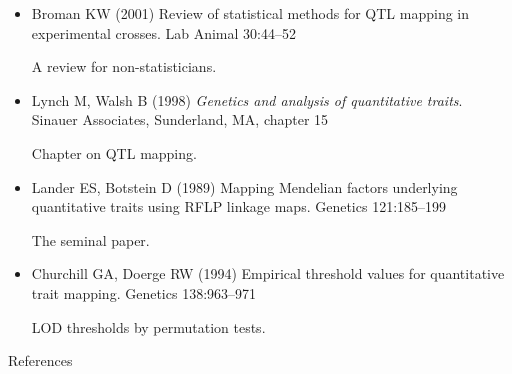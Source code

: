 \documentclass[12pt]{article}
\newcommand{\headsize}{\fontsize{35}{35} \selectfont}
\newcommand{\smallestsize}{\fontsize{18}{22} \selectfont}
\begin{document}
\color{mywhite} \smallestsize

\hspace*{0.5in}
\begin{minipage}{9.5in}
\begin{itemize}
\itemsep12pt
\item Broman KW (2001) Review of statistical methods for QTL mapping in
experimental crosses. Lab Animal 30:44--52

{\color{myblue} A review for non-statisticians.}

\item Lynch M, Walsh B (1998) \emph{Genetics and analysis of quantitative
traits}. Sinauer Associates, Sunderland, MA, chapter 15

{\color{myblue} Chapter on QTL mapping.}

\item Lander ES, Botstein D (1989) Mapping Mendelian factors underlying
quantitative traits using RFLP linkage maps. Genetics
121:185--199

{\color{myblue} The seminal paper.}

\item Churchill GA, Doerge RW (1994) Empirical threshold values for
quantitative trait mapping. Genetics 138:963--971

{\color{myblue} LOD thresholds by permutation tests.}

\end{itemize}
\end{minipage}


\newpage

\headsize \color{myyellow}
\hfill \begin{minipage}{5.75in}
\centering
References
\end{minipage}

\vspace*{15mm}

\color{mywhite} \smallestsize
\end{document}

